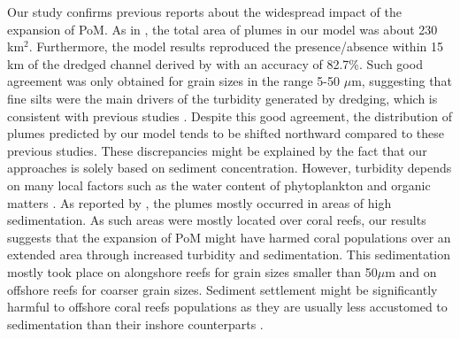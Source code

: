 \documentclass[preprint,12pt,authoryear]{elsarticle}
\begin{document}
Our study confirms previous reports about the widespread impact of the expansion of PoM. As in \cite{barnes2015sediment}, the total area of plumes in our model was about 230 km$^2$. Furthermore, the model results reproduced the presence/absence within 15 km of the dredged channel derived by \cite{cunning2019extensive} with an accuracy of 82.7\%. Such good agreement was only obtained for grain sizes in the range 5-50 $\mu$m, suggesting that fine silts were the main drivers of the turbidity generated by dredging, which is consistent with previous studies \citep{fourney2017additive}. Despite this good agreement, the distribution of plumes predicted by our model tends to be shifted northward compared to these previous studies. These discrepancies might be explained by the fact that our approaches is solely based on sediment concentration. However, turbidity depends on many local factors such as the water content of phytoplankton and organic matters \citep{gray2000comparability,thackston2000improved}. As reported by \cite{cunning2019extensive}, the plumes mostly occurred in areas of high sedimentation. As such areas were mostly located over coral reefs, our results suggests that the expansion of PoM might have harmed coral populations over an extended area through increased turbidity and sedimentation. This sedimentation mostly took place on alongshore reefs for grain sizes smaller than 50$\mu$m and on offshore reefs for coarser grain sizes. Sediment settlement might be significantly harmful to offshore coral reefs populations as they are usually less accustomed to sedimentation than their inshore  counterparts \citep{wolanski2005fine}.
\end{document}
